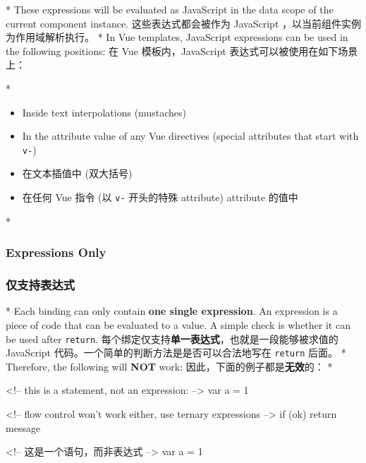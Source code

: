 \begin{paracol}{2}

\switchcolumn[0]*%
These expressions will be evaluated as JavaScript in the data scope of
the current component instance.
\switchcolumn
这些表达式都会被作为 JavaScript ，以当前组件实例为作用域解析执行。
\switchcolumn[0]*%
In Vue templates, JavaScript expressions can be used in the following
positions:
\switchcolumn
在 Vue 模板内，JavaScript 表达式可以被使用在如下场景上：

\switchcolumn[0]*%
\begin{itemize}
\item
Inside text interpolations (mustaches)
\item
In the attribute value of any Vue directives (special attributes that
start with \texttt{v-})
\end{itemize}
\switchcolumn
\begin{itemize}
\item
在文本插值中 (双大括号)
\item
在任何 Vue 指令 (以 \texttt{v-} 开头的特殊 attribute) attribute 的值中
\end{itemize}

\switchcolumn[0]*%
\subsubsection{Expressions Only}
\switchcolumn
\subsubsection{仅支持表达式}
\switchcolumn[0]*%
Each binding can only contain \textbf{one single expression}. An
expression is a piece of code that can be evaluated to a value. A simple
check is whether it can be used after \texttt{return}.
\switchcolumn
每个绑定仅支持\textbf{单一表达式}，也就是一段能够被求值的 JavaScript
代码。一个简单的判断方法是是否可以合法地写在 \texttt{return} 后面。
\switchcolumn[0]*%
Therefore, the following will \textbf{NOT} work:
\switchcolumn
因此，下面的例子都是\textbf{无效}的：
\switchcolumn[0]*%
\begin{codeHtml}
<!-- this is a statement, not an expression: -->
{{ var a = 1 }}

<!-- flow control won't work either, use ternary expressions -->
{{ if (ok) { return message } }}
\end{codeHtml}  
\switchcolumn
\begin{codeHtml}
<!-- 这是一个语句，而非表达式 -->
{{ var a = 1 }}


\end{codeHtml}
\end{paracol}
